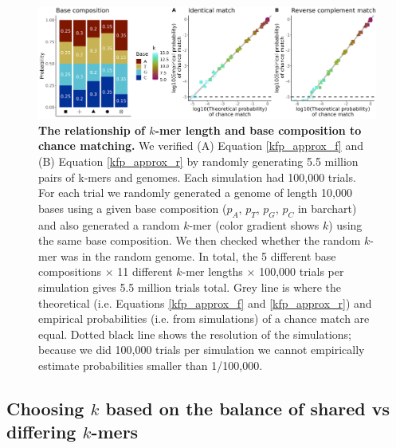 \documentclass[12pt]{article}
\begin{document}
\begin{figure}[H]
    \centering
    \includegraphics[width=\linewidth]{figures/chapter_3/kmer-review-sims-2024-12-06.png}
    \caption{\textbf{The relationship of $k$-mer length and base composition to chance matching.} We verified (A) Equation \ref{kfp_approx_f} and (B) Equation \ref{kfp_approx_r} by randomly generating 5.5 million pairs of k-mers and genomes. Each simulation had 100,000 trials. For each trial we randomly generated a genome of length 10,000 bases using a given base composition ($p_A$, $p_T$, $p_G$, $p_C$ in barchart) and also generated a random $k$-mer (color gradient shows $k$) using the same base composition. We then checked whether the random $k$-mer was in the random genome. In total, the 5 different base compositions $\times$ 11 different $k$-mer lengths $\times$ 100,000 trials per simulation gives 5.5 million trials total. Grey line is where the theoretical (i.e. Equations \ref{kfp_approx_f} and \ref{kfp_approx_r}) and empirical probabilities (i.e. from simulations) of a chance match are equal. Dotted black line shows the resolution of the simulations; because we did 100,000 trials per simulation we cannot empirically estimate probabilities smaller than 1/100,000.}
    \label{fig:equation-test}
\end{figure}

\subsection*{Choosing $k$ based on the balance of shared vs differing $k$-mers}
\end{document}
